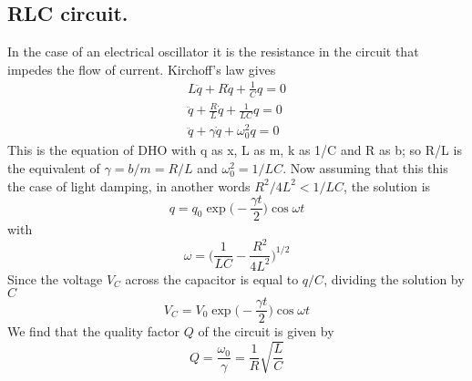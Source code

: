 \documentclass[../../../main.tex]{subfiles}
\begin{document}
\subsection*{RLC circuit.} In the case of an electrical oscillator it is the resistance in the circuit that impedes the flow of current. Kirchoff's law gives
\begin{align*}
    L\ddot{q}+R\dot{q}+\frac{1}{C}q=0\\
    \ddot{q}+\frac{R}{L}\dot{q}+\frac{1}{LC}q=0\\
    \ddot{q}+\gamma\dot{q}+\omega_0^2q=0
\end{align*}    
This is the equation of DHO with q as x, L as m, k as 1/C and R as b; so R/L is the equivalent of $\gamma=b/m=R/L$ and $\omega_0^2=1/LC$. Now assuming that this this the case of light damping, in another words $ R^2/4L^2<1/LC$, the solution is
\begin{equation*}
    q=q_0\exp\biggl(-\frac{\gamma t}{2}\biggr)\cos\omega t
\end{equation*} 
with\begin{equation*}
    \omega =\biggl(\frac{1}{LC}-\frac{R^2}{4L^2}\biggr)^{1/2}
\end{equation*}Since the voltage $V_C$ across the capacitor is equal to $q/C$, dividing the solution by $C$\begin{equation*}
    V_C=V_0\exp\biggl(-\frac{\gamma t}{2}\biggr)\cos\omega t
\end{equation*}
We find that the quality factor $Q$ of the circuit is given by
\begin{equation*}
    Q=\frac{\omega_0}{\gamma}=  \frac{1}{R}\sqrt{\frac{L}{C}}
\end{equation*}
\end{document}

